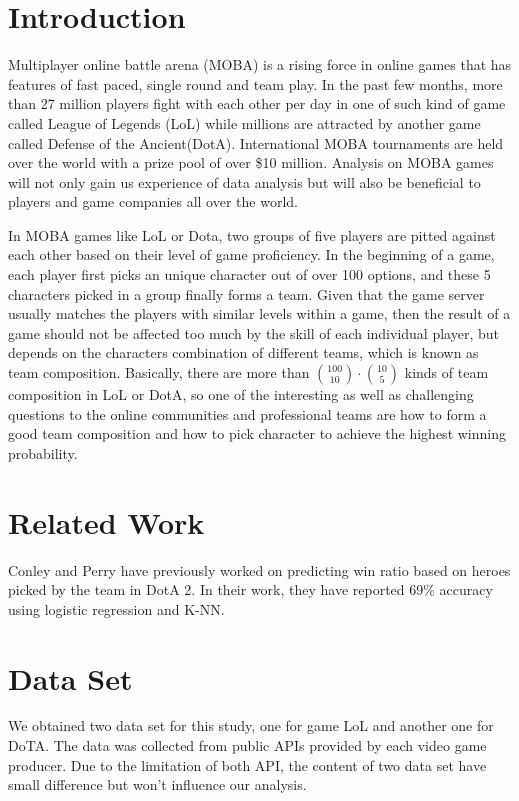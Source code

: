 \documentclass[conference]{IEEEtran}
\begin{document}
\section{Introduction}

Multiplayer online battle arena (MOBA) is a rising force in online games that has features of fast paced, single round and team play. In the past few months, more than 27 million players fight with each other per day in one of such kind of game called League of Legends (LoL)\cite{Ian} while millions are attracted by another game called Defense of the Ancient(DotA). International MOBA tournaments are held over the world with a prize pool of over \$10 million\cite{Valve}.  Analysis on MOBA games will not only gain us experience of data analysis but will also be beneficial to players and game companies all over the world.

In MOBA games like LoL or Dota, two groups of five players are pitted against each other based on their level of game proficiency. In the beginning of a game, each player first picks an unique character out of over 100 options, and these 5 characters picked in a group finally forms a team. Given that the game server usually matches the players with similar levels within a game, then the result of a game should not be affected too much by the skill of each individual player, but depends on the characters combination of different teams, which is known as team composition. Basically, there are more than $\binom{100}{10}\cdot\binom{10}{5}$ kinds of team composition in LoL or DotA, so one of the interesting as well as challenging questions to the online communities and professional teams are how to form a good team composition and how to pick character to achieve the highest winning probability.

\section{Related Work}
Conley and Perry have previously worked on predicting win ratio based on heroes picked by the team in DotA 2. In their work, they have reported 69\% accuracy using logistic regression and K-NN. 



\section{Data Set}
We obtained two data set for this study, one for game LoL and another one for DoTA. The data was collected from public APIs provided by each video game producer. Due to the limitation of both API, the content of two data set have small difference but won't influence our analysis.
\end{document}
